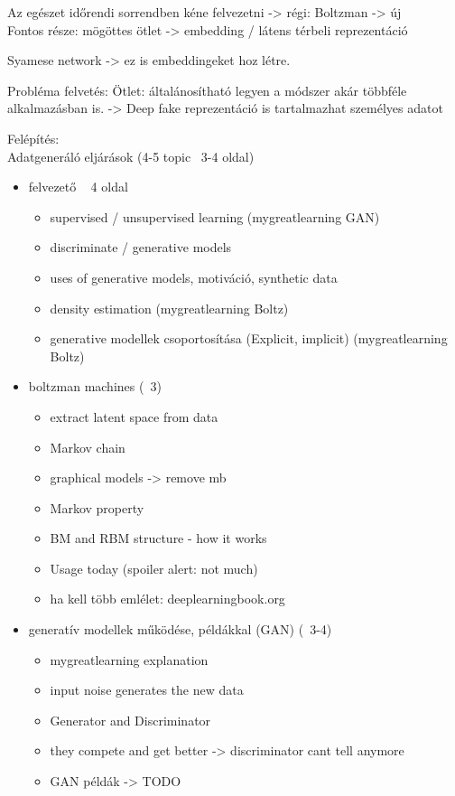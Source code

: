 Az egészet időrendi sorrendben kéne felvezetni -> régi: Boltzman -> új \\
Fontos része: mögöttes ötlet -> embedding / látens térbeli reprezentáció

Syamese network -> ez is embeddingeket hoz létre.

Probléma felvetés:
Ötlet: általánosítható legyen a módszer akár többféle alkalmazásban is. -> Deep fake reprezentáció is tartalmazhat személyes adatot

Felépítés: \\
Adatgeneráló eljárások (4-5 topic ~3-4 oldal)
\begin{itemize}
	\item felvezető ~ 4 oldal 
	\begin{itemize}
		\item supervised / unsupervised learning (mygreatlearning GAN)
		\item discriminate / generative models
		\item uses of generative models, motiváció, synthetic data
		\item density estimation (mygreatlearning Boltz)
		\item generative modellek csoportosítása (Explicit, implicit) (mygreatlearning Boltz)
	\end{itemize}
	\item boltzman machines (~3)
	\begin{itemize}
		\item extract latent space from data
		\item Markov chain
		\item graphical models -> remove mb
		\item Markov property
		\item BM and RBM structure - how it works
		\item Usage today (spoiler alert: not much)
		\item ha kell több emlélet: deeplearningbook.org
	\end{itemize}
	\item generatív modellek működése, példákkal (GAN) (~3-4)
	\begin{itemize}
		\item mygreatlearning explanation
		\item input noise generates the new data
		\item Generator and Discriminator
		\item they compete and get better -> discriminator cant tell anymore
		\item GAN példák -> TODO

\end{itemize}
\end{itemize}

